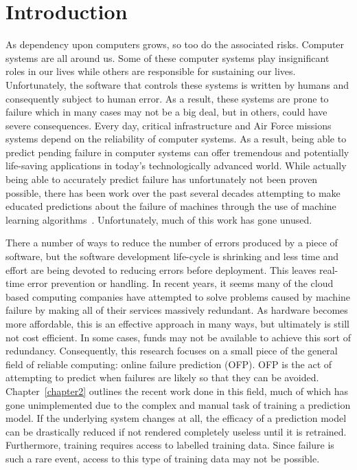 \chapter{Introduction} \label{chapter1}
As dependency upon computers grows, so too do the associated risks.  Computer
systems are all around us.  Some of these computer systems play insignificant
roles in our lives while others are responsible for sustaining our lives.
Unfortunately, the software that controls these systems is written by humans
and consequently subject to human error.  As a result, these systems are prone
to failure which in many cases may not be a big deal, but in others, could have
severe consequences.  Every day, critical infrastructure and Air Force missions
systems depend on the reliability of computer systems.  As a result, being able
to predict pending failure in computer systems can offer tremendous and
potentially life-saving applications in today's technologically advanced world.
While actually being able to accurately predict failure has unfortunately not
been proven possible, there has been work over the past several decades
attempting to make educated predictions about the failure of machines through
the use of machine learning algorithms~\cite{salfnerSurvey}.  Unfortunately,
much of this work has gone unused.  

There a number of ways to reduce the number of errors produced by a piece of
software, but the software development life-cycle is shrinking and less time
and effort are being devoted to reducing errors before deployment.  This leaves
real-time error prevention or handling.  In recent years, it seems many of the
cloud based computing companies have attempted to solve problems caused by
machine failure by making all of their services massively redundant.  As
hardware becomes more affordable, this is an effective approach in many ways,
but ultimately is still not cost efficient.  In some cases, funds may not be
available to achieve this sort of redundancy.  Consequently, this research
focuses on a small piece of the general field of reliable computing: online
failure prediction (OFP).  OFP is the act of attempting to predict when
failures are likely so that they can be avoided.  Chapter~\ref{chapter2}
outlines the recent work done in this field, much of which has gone
unimplemented due to the complex and manual task of training a prediction
model.  If the underlying system changes at all, the efficacy of a prediction
model can be drastically reduced if not rendered completely useless until it is
retrained.  Furthermore, training requires access to labelled training data.
Since failure is such a rare event, access to this type of training data may
not be possible.  

